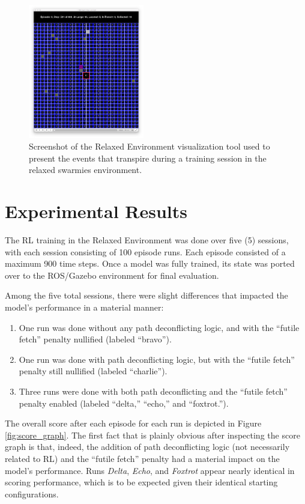 \documentclass[sigconf,authordraft]{acmart}
\begin{document}
\begin{figure}[ht!]
  \centering
  \includegraphics[width=0.45\textwidth]{images/relaxed_screenshot.png}
  \caption{Screenshot of the Relaxed Environment visualization tool used to present the events that transpire during a training session in the relaxed swarmies environment.}
  \label{fig:relaxed_screenshot}
\end{figure}

\section{Experimental Results}\label{sec:results}
The RL training in the Relaxed Environment was done over five (5) sessions, with each session consisting of 100 episode runs. Each episode consisted of a maximum 900 time steps. Once a model was fully trained, its state was ported over to the ROS/Gazebo environment for final evaluation.

Among the five total sessions, there were slight differences that impacted the model's performance in a material manner:
\begin{enumerate}
  \item One run was done without any path deconflicting logic, and with the ``futile fetch'' penalty nullified (labeled ``bravo'').
  \item One run was done with path deconflicting logic, but with the ``futile fetch'' penalty still nullified (labeled ``charlie'').
  \item Three runs were done with both path deconflicting and the ``futile fetch'' penalty enabled (labeled ``delta,'' ``echo,'' and ``foxtrot.'').
\end{enumerate}

The overall score after each episode for each run is depicted in Figure \ref{fig:score_graph}. The first fact that is plainly obvious after inspecting the score graph is that, indeed, the addition of path deconflicting logic (not necessarily related to RL) and the ``futile fetch'' penalty had a material impact on the model's performance. Runs \textit{Delta}, \textit{Echo}, and \textit{Foxtrot} appear nearly identical in scoring performance, which is to be expected given their identical starting configurations.
\end{document}
